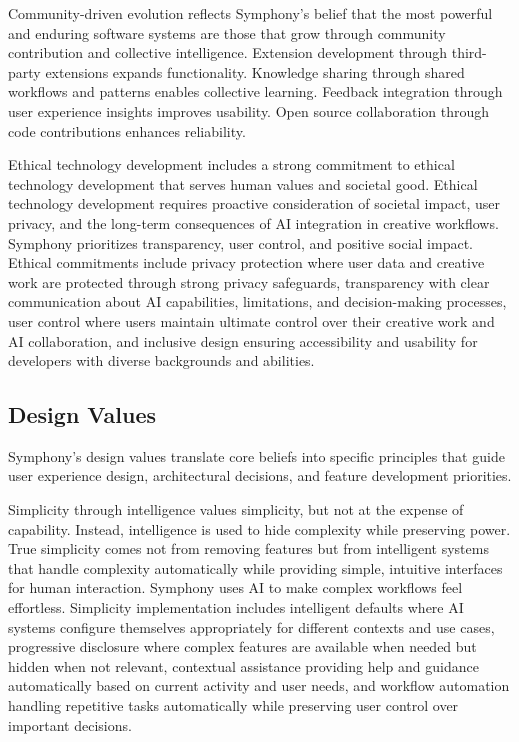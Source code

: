 Community-driven evolution reflects Symphony's belief that the most powerful and enduring software systems are those that grow through community contribution and collective intelligence. Extension development through third-party extensions expands functionality. Knowledge sharing through shared workflows and patterns enables collective learning. Feedback integration through user experience insights improves usability. Open source collaboration through code contributions enhances reliability.

Ethical technology development includes a strong commitment to ethical technology development that serves human values and societal good. Ethical technology development requires proactive consideration of societal impact, user privacy, and the long-term consequences of AI integration in creative workflows. Symphony prioritizes transparency, user control, and positive social impact. Ethical commitments include privacy protection where user data and creative work are protected through strong privacy safeguards, transparency with clear communication about AI capabilities, limitations, and decision-making processes, user control where users maintain ultimate control over their creative work and AI collaboration, and inclusive design ensuring accessibility and usability for developers with diverse backgrounds and abilities.

\subsection{Design Values}

Symphony's design values translate core beliefs into specific principles that guide user experience design, architectural decisions, and feature development priorities.

Simplicity through intelligence values simplicity, but not at the expense of capability. Instead, intelligence is used to hide complexity while preserving power. True simplicity comes not from removing features but from intelligent systems that handle complexity automatically while providing simple, intuitive interfaces for human interaction. Symphony uses AI to make complex workflows feel effortless. Simplicity implementation includes intelligent defaults where AI systems configure themselves appropriately for different contexts and use cases, progressive disclosure where complex features are available when needed but hidden when not relevant, contextual assistance providing help and guidance automatically based on current activity and user needs, and workflow automation handling repetitive tasks automatically while preserving user control over important decisions.

